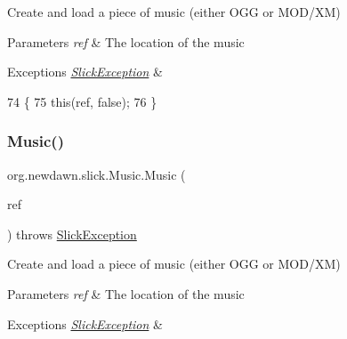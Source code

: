 Create and load a piece of music (either O\+GG or M\+O\+D/\+XM)


\begin{DoxyParams}{Parameters}
{\em ref} & The location of the music \\
\hline
\end{DoxyParams}

\begin{DoxyExceptions}{Exceptions}
{\em \mbox{\hyperlink{classorg_1_1newdawn_1_1slick_1_1_slick_exception}{Slick\+Exception}}} & \\
\hline
\end{DoxyExceptions}

\begin{DoxyCode}
74                                                    \{
75         \textcolor{keyword}{this}(ref, \textcolor{keyword}{false});
76     \}
\end{DoxyCode}
\mbox{\label{classorg_1_1newdawn_1_1slick_1_1_music_a53829cfbe22f4a70e1cec04763ef9503}} 
\subsubsection{\texorpdfstring{Music()}{Music()}\hspace{0.1cm}{\footnotesize\ttfamily [2/5]}}
{\footnotesize\ttfamily org.\+newdawn.\+slick.\+Music.\+Music (\begin{DoxyParamCaption}\item[{U\+RL}]{ref }\end{DoxyParamCaption}) throws \mbox{\hyperlink{classorg_1_1newdawn_1_1slick_1_1_slick_exception}{Slick\+Exception}}\hspace{0.3cm}{\ttfamily [inline]}}

Create and load a piece of music (either O\+GG or M\+O\+D/\+XM)


\begin{DoxyParams}{Parameters}
{\em ref} & The location of the music \\
\hline
\end{DoxyParams}

\begin{DoxyExceptions}{Exceptions}
{\em \mbox{\hyperlink{classorg_1_1newdawn_1_1slick_1_1_slick_exception}{Slick\+Exception}}} & \\
\hline
\end{DoxyExceptions}

